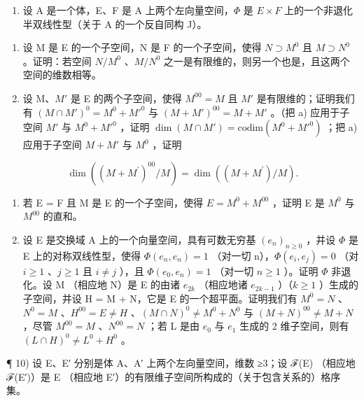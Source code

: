 \begin{enumerate}
\def\labelenumi{\arabic{enumi})}
\setcounter{enumi}{8}
\tightlist
\item
  设 A 是一个体，E、F 是 A 上两个左向量空间，\(\Phi\) 是 \(E \times F\) 上的一个非退化半双线性型（关于 A 的一个反自同构 J）。
\end{enumerate}

\begin{enumerate}
\def\labelenumi{\alph{enumi})}
\item
  设 M 是 E 的一个子空间，N 是 F 的一个子空间，使得 \(N \supset M^{0}\) 且 \(M \supset N^{0}\) 。证明：若空间 \(N/M^{0}\) 、\(M/N^{0}\) 之一是有限维的，则另一个也是，且这两个空间的维数相等。
\item
  设 M、\(M'\) 是 E 的两个子空间，使得 \(M^{00} = M\) 且 \(M'\) 是有限维的；证明我们有 \((M \cap M')^{0} = M^{0} + M'^{0}\) 与 \((M + M')^{00} = M + M'\) 。（把 a) 应用于子空间 \(M'\) 与 \(M^{0} + M'^{0}\) ，证明 \(\dim(M \cap M') = \text{codim}(M^{0} + M'^{0})\) ；把 a) 应用于子空间 \(M + M'\) 与 \(M^{0}\) ，证明
\end{enumerate}

\[
\dim ((M + M ^ {\prime}) ^ {0 0} / M) = \dim ((M + M ^ {\prime}) / M).
\]

\begin{enumerate}
\def\labelenumi{\alph{enumi})}
\setcounter{enumi}{2}
\item
  若 E = F 且 M 是 E 的一个子空间，使得 \(E = M^{0} + M^{00}\) ，证明 E 是 \(M^{0}\) 与 \(M^{00}\) 的直和。
\item
  设 E 是交换域 A 上的一个向量空间，具有可数无穷基 \((e_{n})_{n\geqslant0}\) ，并设 \(\Phi\) 是 E 上的对称双线性型，使得 \(\Phi(e_{n}, e_{n}) = 1\) （对一切 n），\(\Phi(e_{i}, e_{j}) = 0\) （对 \(i \geqslant 1\) 、\(j \geqslant 1\) 且 \(i \neq j\) ），且 \(\Phi(e_{0}, e_{n}) = 1\) （对一切 \(n \geqslant 1\) ）。证明 \(\Phi\) 非退化。设 M （相应地 N）是 E 的由诸 \(e_{2k}\) （相应地诸 \(e_{2k-1}\) ）（\(k \geqslant 1\) ）生成的子空间，并设 H = M + N，它是 E 的一个超平面。证明我们有 \(M^{0} = N\) 、\(N^{0} = M\) 、\(H^{00} = E \neq H\) 、\((M \cap N)^{0} \neq M^{0} + N^{0}\) 与 \((M + N)^{00} \neq M + N\) ，尽管 \(M^{00} = M\) 、\(N^{00} = N\) ；若 L 是由 \(e_{0}\) 与 \(e_{1}\) 生成的 2 维子空间，则有 \((L \cap H)^{0} \neq L^{0} + H^{0}\) 。
\end{enumerate}

¶ 10) 设 E、E′ 分别是体 A、A′ 上两个左向量空间，维数 ≥3；设 ℱ(E) （相应地 ℱ(E′)）是 E （相应地 E′）的有限维子空间所构成的（关于包含关系的）格序集。

